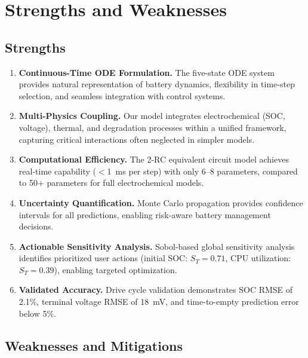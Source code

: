 \section{Strengths and Weaknesses}
\label{sec:posneg}

\subsection{Strengths}

\begin{enumerate}
    \item \textbf{Continuous-Time ODE Formulation.} 
    The five-state ODE system provides natural representation of battery dynamics, flexibility in time-step selection, and seamless integration with control systems.
    
    \item \textbf{Multi-Physics Coupling.} 
    Our model integrates electrochemical (SOC, voltage), thermal, and degradation processes within a unified framework, capturing critical interactions often neglected in simpler models.
    
    \item \textbf{Computational Efficiency.} 
    The 2-RC equivalent circuit model achieves real-time capability ($<$1~ms per step) with only 6--8 parameters, compared to 50+ parameters for full electrochemical models.
    
    \item \textbf{Uncertainty Quantification.} 
    Monte Carlo propagation provides confidence intervals for all predictions, enabling risk-aware battery management decisions.
    
    \item \textbf{Actionable Sensitivity Analysis.} 
    Sobol-based global sensitivity analysis identifies prioritized user actions (initial SOC: $S_T=0.71$, CPU utilization: $S_T=0.39$), enabling targeted optimization.
    
    \item \textbf{Validated Accuracy.} 
    Drive cycle validation demonstrates SOC RMSE of 2.1\%, terminal voltage RMSE of 18~mV, and time-to-empty prediction error below 5\%.
\end{enumerate}

\subsection{Weaknesses and Mitigations}

